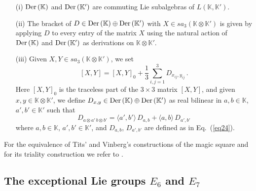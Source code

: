 \documentclass{article}
\newcommand{\be}{\begin{equation}}
\newcommand{\ee}{\end{equation}}
\begin{document}
\begin{enumerate}
\item[(i)] ${\rm Der} \, ({\mathbb K})$ and ${\rm Der} \, ({\mathbb K}')$ are commuting Lie subalgebras of $L ({\mathbb K} , {\mathbb K}')$.
\item[(ii)] The bracket of $D \in {\rm Der} \, ({\mathbb K}) \oplus {\rm Der} \, ({\mathbb K}')$ with $X \in sa_3 ({\mathbb K} \otimes {\mathbb K}')$ is given by applying $D$ to every entry of the matrix $X$ using the natural action of ${\rm Der} \, ({\mathbb K})$ and ${\rm Der} \, ({\mathbb K}')$ as derivations on ${\mathbb K} \otimes {\mathbb K}'$.
\item[(iii)] Given $X,Y \in sa_3 ({\mathbb K} \otimes {\mathbb K}')$, we set
\be
\label{eq317}
[X,Y] = [X,Y]_0 + \frac13 \sum_{i,j=1}^3 D_{x_{ij} , y_{ij}} \, .
\ee
Here $[X,Y]_0$ is the traceless part of the $3 \times 3$ matrix $[X,Y]$, and given $x,y \in {\mathbb K} \otimes {\mathbb K}'$, we define $D_{x,y} \in {\rm Der} \, ({\mathbb K}) \oplus {\rm Der} \, ({\mathbb K}')$ as real bilinear in $a,b \in {\mathbb K}$, $a',b' \in {\mathbb K}'$ such that
\be
\label{eq318}
D_{a \otimes a' \, b \otimes b'} = \langle a',b' \rangle \, D_{a,b} + \langle a,b \rangle \, D_{a',b'}
\ee
where $a,b \in {\mathbb K}$, $a',b' \in {\mathbb K}'$, and $D_{a,b}$, $D_{a',b'}$ are defined as in Eq.~(\ref{eq24}).
\end{enumerate}

\smallskip

For the equivalence of Tits' and Vinberg's constructions of the magic square and for its triality construction we refer to \cite{B,BS}.

\subsection{The exceptional Lie groups $E_6$ and $E_7$}
\end{document}
